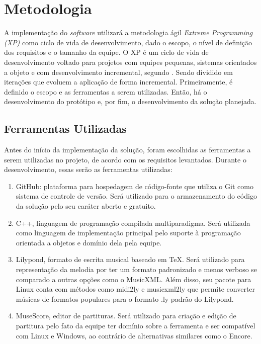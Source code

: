 \chapter[Metodologia]{Metodologia}

  A implementação do \textit{software} utilizará a metodologia ágil \textit{Extreme Programming (XP)} como ciclo de vida de desenvolvimento, dado o escopo, o nível de definição dos requisitos e o tamanho da equipe. O XP é um ciclo de vida de desenvolvimento voltado para projetos com equipes pequenas, sistemas orientados a objeto e com desenvolvimento incremental, segundo . Sendo dividido em iterações que evoluem a aplicação de forma incremental. Primeiramente, é definido o escopo e as ferramentas a serem utilizadas. Então, há o desenvolvimento do protótipo e, por fim, o desenvolvimento da solução planejada.

  \section[Ferramentas Utilizadas]{Ferramentas Utilizadas}

    Antes do início da implementação da solução, foram escolhidas as ferramentas a serem utilizadas no projeto, de acordo com os requisitos levantados. Durante o desenvolvimento, essas serão as ferramentas utilizadas:

  \begin{enumerate}
    \item GitHub\footnotemark {}: plataforma para hospedagem de código-fonte que utiliza o Git como sistema de controle de versão. Será utilizado para o armazenamento do código da solução pelo seu caráter aberto e gratuito.
    \item C++\footnotemark {}, linguagem de programação compilada multiparadigma. Será utilizada como linguagem de implementação principal pelo suporte à programação orientada a objetos e domínio dela pela equipe.
    \item Lilypond\footnotemark {}, formato de escrita musical baseado em TeX. Será utilizado para representação da melodia por ter um formato padronizado e menos verboso se comparado a outras opções como o MusicXML. Além disso, seu pacote para Linux conta com métodos como midi2ly e musicxml2ly que permite converter músicas de formatos populares para o formato .ly padrão do Lilypond.
    \item MuseScore\footnotemark {}, editor de partituras. Será utilizado para criação e edição de partitura pelo fato da equipe ter domínio sobre a ferramenta e ser compatível com Linux e Windows, ao contrário de alternativas similares como o Encore.
  \end{enumerate}

